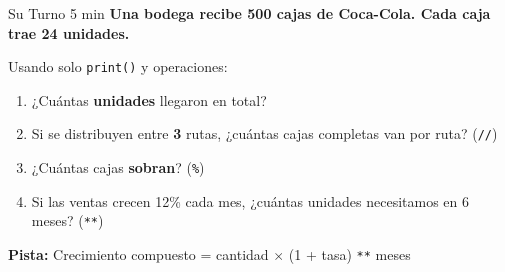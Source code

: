 \documentclass[aspectratio=169, 11pt]{beamer}
\begin{document}
\begin{frame}[fragile]{Su Turno \hfill {\normalsize\color{arcaRed}\faClock\hspace{4pt}5 min}}
  \vspace{-6pt}
  {\small\color{arcaDark}\bfseries
    Una bodega recibe 500 cajas de Coca-Cola. Cada caja trae 24 unidades.}

  \vspace{4pt}
  {\footnotesize\color{textMuted}
  Usando solo \texttt{print()} y operaciones:}

  \vspace{3pt}
  {\footnotesize
  \begin{enumerate}\setlength{\itemsep}{2pt}
    \item[{\color{arcaRed}\bfseries 1.}]
      ¿Cuántas \textbf{unidades} llegaron en total?
    \item[{\color{arcaRed}\bfseries 2.}]
      Si se distribuyen entre \textbf{3} rutas,
      ¿cuántas cajas completas van por ruta? (\texttt{//})
    \item[{\color{arcaRed}\bfseries 3.}]
      ¿Cuántas cajas \textbf{sobran}? (\texttt{\%})
    \item[{\color{arcaRed}\bfseries 4.}]
      Si las ventas crecen 12\% cada mes,
      ¿cuántas unidades necesitamos en 6 meses? (\texttt{**})
  \end{enumerate}
  }

  \vspace{4pt}
  {\scriptsize\color{textMuted}
    \faLightbulb[regular]\hspace{4pt}\textbf{Pista:}
    Crecimiento compuesto = cantidad $\times$ (1 + tasa) \texttt{**} meses}
\end{frame}
\end{document}
